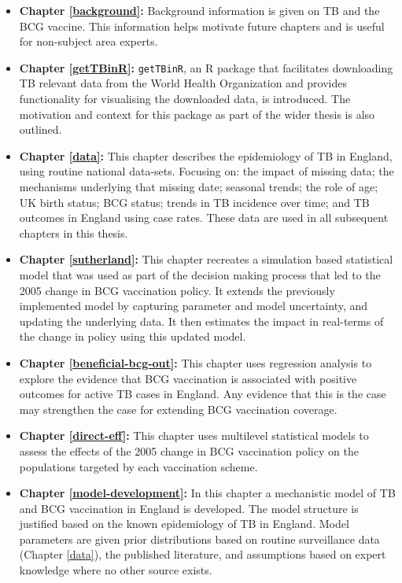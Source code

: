 \documentclass[11pt,twoside]{bristolthesis}
\begin{document}
  \begin{itemize}
  \item
    \textbf{Chapter \ref{background}:} Background information is given on TB and the BCG vaccine. This information helps motivate future chapters and is useful for non-subject area experts.
  \item
    \textbf{Chapter \ref{getTBinR}:} \texttt{getTBinR}, an R package that facilitates downloading TB relevant data from the World Health Organization and provides functionality for visualising the downloaded data, is introduced. The motivation and context for this package as part of the wider thesis is also outlined.
  \item
    \textbf{Chapter \ref{data}:} This chapter describes the epidemiology of TB in England, using routine national data-sets. Focusing on: the impact of missing data; the mechanisms underlying that missing date; seasonal trends; the role of age; UK birth status; BCG status; trends in TB incidence over time; and TB outcomes in England using case rates. These data are used in all subsequent chapters in this thesis.
  \item
    \textbf{Chapter \ref{sutherland}:} This chapter recreates a simulation based statistical model that was used as part of the decision making process that led to the 2005 change in BCG vaccination policy. It extends the previously implemented model by capturing parameter and model uncertainty, and updating the underlying data. It then estimates the impact in real-terms of the change in policy using this updated model.
  \item
    \textbf{Chapter \ref{beneficial-bcg-out}:} This chapter uses regression analysis to explore the evidence that BCG vaccination is associated with positive outcomes for active TB cases in England. Any evidence that this is the case may strengthen the case for extending BCG vaccination coverage.
  \item
    \textbf{Chapter \ref{direct-eff}:} This chapter uses multilevel statistical models to assess the effects of the 2005 change in BCG vaccination policy on the populations targeted by each vaccination scheme.
  \item
    \textbf{Chapter \ref{model-development}:} In this chapter a mechanistic model of TB and BCG vaccination in England is developed. The model structure is justified based on the known epidemiology of TB in England. Model parameters are given prior distributions based on routine surveillance data (Chapter \ref{data}), the published literature, and assumptions based on expert knowledge where no other source exists.

\end{itemize}
\end{document}
